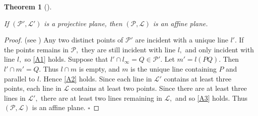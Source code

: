 \documentclass[
  twoside,
  12pt,
  letterpaper,
  fleqn]{article}
\theoremstyle{definition}
\theoremstyle{definition}
\theoremstyle{plain}
\theoremstyle{plain}
\newtheorem{theorem}{Theorem}[section]
\theoremstyle{remark}
\begin{document}
\begin{theorem}[]\protect\hypertarget{thm-projective-plane}{}\label{thm-projective-plane}

If \((\mathcal{P}',\mathcal{L}')\) is a projective plane, then
\((\mathcal{P},\mathcal{L})\) is an affine plane.

\end{theorem}

\begin{proof}

(see \textcite{MR1344447}) Any two distinct points of \(\mathcal{P}'\)
are incident with a unique line \(l'.\) If the points remains in
\(\mathcal{P},\) they are still incident with line \(l,\) and only
incident with line \(l,\) so \ref{A1} holds. Suppose that
\(l'\cap l_{\infty}=Q\in \mathcal{P}'.\) Let \(m'=l(PQ).\) Then
\(l'\cap m'=Q.\) Thus \(l\cap m\) is empty, and \(m\) is the unique line
containing \(P\) and parallel to \(l.\) Hence \ref{A2} holds. Since each
line in \(\mathcal{L}'\) contains at least three points, each line in
\(\mathcal{L}\) contains at least two points. Since there are at least
three lines in \(\mathcal{L}',\) there are at least two lines remaining
in \(\mathcal{L},\) and so \ref{A3} holds. Thus
\((\mathcal{P},\mathcal{L})\) is an affine plane. \(\square\)

\end{proof}


\printbibliography



\thispagestyle{empty}
\end{document}
